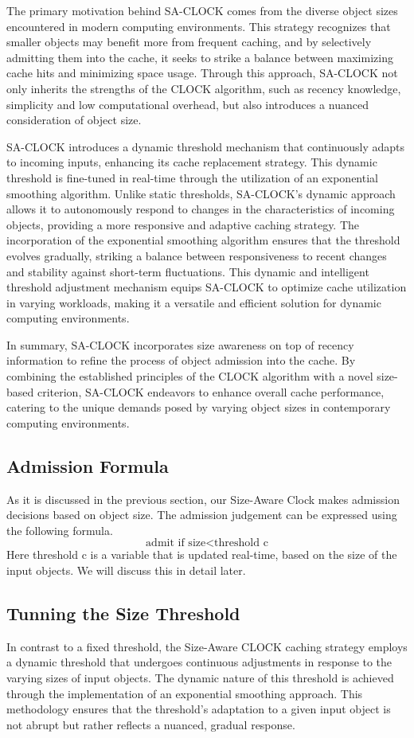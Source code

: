\documentclass[conference]{IEEEtran}
\begin{document}
The primary motivation behind SA-CLOCK comes from the diverse object sizes encountered in modern computing environments. This strategy recognizes that smaller objects may benefit more from frequent caching, and by selectively admitting them into the cache, it seeks to strike a balance between maximizing cache hits and minimizing space usage. Through this approach, SA-CLOCK not only inherits the strengths of the CLOCK algorithm, such as recency knowledge, simplicity and low computational overhead, but also introduces a nuanced consideration of object size.

SA-CLOCK introduces a dynamic threshold mechanism that continuously adapts to incoming inputs, enhancing its cache replacement strategy. This dynamic threshold is fine-tuned in real-time through the utilization of an exponential smoothing algorithm. Unlike static thresholds, SA-CLOCK's dynamic approach allows it to autonomously respond to changes in the characteristics of incoming objects, providing a more responsive and adaptive caching strategy. The incorporation of the exponential smoothing algorithm ensures that the threshold evolves gradually, striking a balance between responsiveness to recent changes and stability against short-term fluctuations. This dynamic and intelligent threshold adjustment mechanism equips SA-CLOCK to optimize cache utilization in varying workloads, making it a versatile and efficient solution for dynamic computing environments.

In summary, SA-CLOCK incorporates size awareness on top of recency information to refine the process of object admission into the cache. By combining the established principles of the CLOCK algorithm with a novel size-based criterion, SA-CLOCK endeavors to enhance overall cache performance, catering to the unique demands posed by varying object sizes in contemporary computing environments.

\subsection{Admission Formula}
As it is discussed in the previous section, our Size-Aware Clock makes admission decisions based on object size. The admission judgement can be expressed using the following formula.
\[
\text{admit if } \text{size} < \text{threshold} \text{ c}
\]
Here threshold c is a variable that is updated real-time, based on the size of the input objects. We will discuss this in detail later.

\subsection{Tunning the Size Threshold}
In contrast to a fixed threshold, the Size-Aware CLOCK caching strategy employs a dynamic threshold that undergoes continuous adjustments in response to the varying sizes of input objects. The dynamic nature of this threshold is achieved through the implementation of an exponential smoothing approach. This methodology ensures that the threshold's adaptation to a given input object is not abrupt but rather reflects a nuanced, gradual response.
\end{document}

